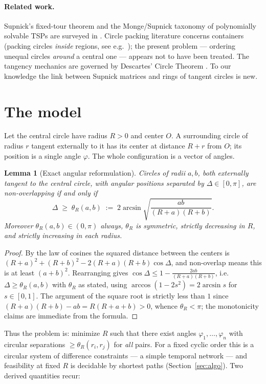\documentclass[11pt]{article}
\newtheorem{lemma}[theorem]{Lemma}
\theoremstyle{definition}
\theoremstyle{remark}
\DeclareMathOperator{\asin}{arcsin}
\begin{document}
\paragraph{Related work.}
Supnick's fixed-tour theorem \cite{supnick} and the Monge/Supnick taxonomy of polynomially solvable TSPs are surveyed in \cite{bdvvw}. Circle packing literature concerns containers (packing circles \emph{inside} regions, see e.g.\ \cite{hifi}); the present problem --- ordering unequal circles \emph{around} a central one --- appears not to have been treated. The tangency mechanics are governed by Descartes' Circle Theorem \cite{descartes-ref}. To our knowledge the link between Supnick matrices and rings of tangent circles is new.

\section{The model}\label{sec:model}

Let the central circle have radius $R>0$ and center $O$. A surrounding circle of radius $r$ tangent externally to it has its center at distance $R+r$ from $O$; its position is a single angle $\varphi$. The whole configuration is a vector of angles.

\begin{lemma}[Exact angular reformulation]\label{lem:angular}
Circles of radii $a,b$, both externally tangent to the central circle, with angular positions separated by $\Delta\in[0,\pi]$, are non-overlapping if and only if
\[
\Delta \;\ge\; \theta_R(a,b)\;:=\;2\asin\sqrt{\frac{ab}{(R+a)(R+b)}}.
\]
Moreover $\theta_R(a,b)\in(0,\pi)$ always, $\theta_R$ is symmetric, strictly decreasing in $R$, and strictly increasing in each radius.
\end{lemma}

\begin{proof}
By the law of cosines the squared distance between the centers is $(R+a)^2+(R+b)^2-2(R+a)(R+b)\cos\Delta$, and non-overlap means this is at least $(a+b)^2$. Rearranging gives $\cos\Delta\le 1-\frac{2ab}{(R+a)(R+b)}$, i.e.\ $\Delta\ge\theta_R(a,b)$ with $\theta_R$ as stated, using $\arccos(1-2s^2)=2\asin s$ for $s\in[0,1]$. The argument of the square root is strictly less than $1$ since $(R+a)(R+b)-ab=R(R+a+b)>0$, whence $\theta_R<\pi$; the monotonicity claims are immediate from the formula.
\end{proof}

Thus the problem is: minimize $R$ such that there exist angles $\varphi_1,\dots,\varphi_n$ with circular separations $\ge\theta_R(r_i,r_j)$ for \emph{all} pairs. For a fixed cyclic order this is a circular system of difference constraints --- a simple temporal network --- and feasibility at fixed $R$ is decidable by shortest paths (Section~\ref{sec:algo}). Two derived quantities recur:
\end{document}
